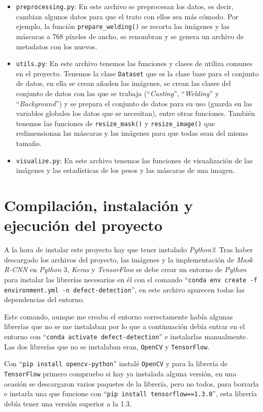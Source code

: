 \begin{itemize}
    \item \texttt{preprocessing.py}: En este archivo se preprocesan los datos, es decir, cambian algunos datos para que el trato con ellos sea más cómodo. Por ejemplo, la función \texttt{prepare\_welding()} se recorta las imágenes y las máscaras a 768 píxeles de ancho, se renombran y se genera un archivo de metadatos con los nuevos.
    \item \texttt{utils.py}: En este archivo tenemos las funciones y clases de utiliza comunes en el proyecto. Tenemos la clase \texttt{Dataset} que es la clase base para el conjunto de datos, en ella se crean añaden las imágenes, se crean las clases del conjunto de datos con las que se trabaja (``\textit{Casting}'', ``\textit{Welding}'' y ``\textit{Background}'') y se prepara el conjunto de datos para su uso (guarda en las variables globales los datos que se necesitan), entre otras funciones. También tenemos las funciones de \texttt{resize\_mask()} y \texttt{resize\_image()} que redimensionan las máscaras y las imágenes para que todas sean del mismo tamaño.
    \item \texttt{visualize.py}: En este archivo tenemos las funciones de visualización de las imágenes y las estadísticas de los pesos y las máscaras de una imagen.
\end{itemize}

\section{Compilación, instalación y ejecución del proyecto \label{com_ins_eje}}

A la hora de instalar este proyecto hay que tener instalado \textit{Python3}. Tras haber descargado los archivos del proyecto, las imágenes y la implementación de \textit{Mask R-CNN} en \textit{Python} 3, \textit{Keras} y \textit{TensorFlow} se debe crear un entorno de \textit{Python} para instalar las librerías necesarias en él con el comando ``\texttt{conda env create -f environment.yml -n defect-detection}'', en este archivo aparecen todas las dependencias del entorno.

Este comando, aunque me creaba el entorno correctamente había algunas librerías que no se me instalaban por lo que a continuación debía entrar en el entorno con ``\texttt{conda activate defect-detection}'' e instalarlas manualmente. Las dos librerías que no se instalaban eran, \texttt{OpenCV} y \texttt{TensorFlow}.

Con ``\texttt{pip install opencv-python}'' instalé \texttt{OpenCV} y para la librería de \texttt{TensorFlow} primero compruebo si hay ya instalada alguna versión, en una ocasión se descargaron varios paquetes de la librería, pero no todos, para borrarla e instarla una que funcione con ``\texttt{pip install tensorflow==1.3.0}'', esta librería debía tener una versión superior a la 1.3.


